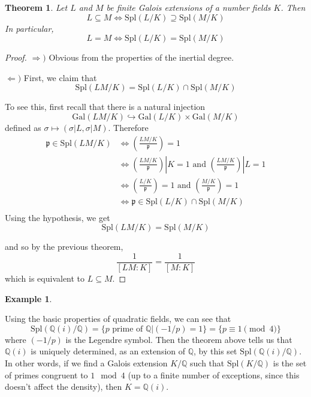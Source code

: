 \documentclass[]{amsart}
\newtheorem{theorem}{Theorem}
\newtheorem{ex}{Example}
\newcommand{\Q}{\mathbb{Q}}
\newcommand{\Spl}{\text{Spl}}
\newcommand{\p}{\mathfrak{p}}
\newcommand{\Frob}[2]{\left(\frac{#1}{#2}\right )}
\newcommand{\Gal}{\text{Gal}}
\begin{document}
			\begin{theorem}
				Let $L$ and $M$ be finite Galois extensions of a number fields $K$. Then
				\[L\subseteq M\Leftrightarrow\text{Spl}(L/K)\supseteq\Spl(M/K)\]
				In particular, 
				\[L=M\Leftrightarrow\text{Spl}(L/K)=\Spl(M/K)\]				
			\end{theorem}
			\begin{proof}
				$\Rightarrow)$ Obvious from the properties of the inertial degree.
				
				$\Leftarrow)$ First, we claim that
				\[\Spl(LM/K)=\Spl(L/K)\cap\Spl(M/K)\]
				
				To see this, first recall that there is a natural injection
				\[\Gal(LM/K)\hookrightarrow\Gal(L/K)\times\Gal(M/K)\]
				defined as $\sigma\mapsto (\sigma|L,\sigma|M)$. Therefore
				\begin{align*}
					\p\in\Spl(LM/K) &\Leftrightarrow \Frob{LM/K}{\p}=1\\
									&\Leftrightarrow \Frob{LM/K}{\p}|K=1\text{ and }\Frob{LM/K}{\p}|L=1\\
									&\Leftrightarrow \Frob{L/K}{\p}=1\text{ and }\Frob{M/K}{\p}=1\\
									&\Leftrightarrow \p\in\Spl(L/K)\cap\Spl(M/K)\\
				\end{align*}			
				Using the hypothesis, we get
				\[\Spl(LM/K)=\Spl(M/K)\]
				
				and so by the previous theorem, 
				\[\frac{1}{[LM:K]}=\frac{1}{[M:K]}\]
				which is equivalent to $L\subseteq M$.
			\end{proof}
			
			\begin{ex}\end{ex}
			Using the basic properties of quadratic fields, we can see that
			\[\Spl(\Q(i)/\Q)=\{p\text{ prime of }\Q|(-1/p)=1\}=\{p\equiv 1\pmod 4\}\]
			where $(-1/p)$ is the Legendre symbol. Then the theorem above tells us that $\Q(i)$ is uniquely determined, as an extension of $\Q$, by this set $\Spl(\Q(i)/\Q)$. In other words, if we find a Galois extension $K/\Q$ such that $\Spl(K/\Q)$ is the set of primes congruent to $1 \mod 4$ (up to a finite number of exceptions, since this doesn't affect the density), then $K=\Q(i)$.
			
\end{document}
